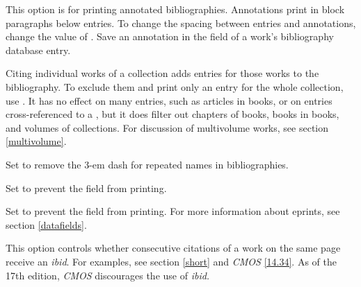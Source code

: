 \documentclass[11pt,letterpaper,oneside]{article}
\begin{document}
\begin{optionlist}


\noindent This option is for printing annotated bibliographies.
Annotations print in block paragraphs below entries. To change
the spacing between entries and annotations, change the value of
. Save an annotation in the 
field of a work's bibliography database entry.


\noindent Citing individual works of a collection adds entries for
those works to the bibliography. To exclude them and print only an
entry for the whole collection, use . It has no effect
on many  entries, such as articles in books, or
on  entries cross-referenced to a
, but it does filter out chapters of books, books
in books, and volumes of collections. For discussion of multivolume
works, see section \ref{multivolume}.


\noindent Set  to remove the 3-em dash for repeated names
in bibliographies.


\noindent Set  to prevent the  field from
printing.


\noindent Set  to prevent the  field from
printing. For more information about eprints, see section
\ref{datafields}.


\noindent This option controls whether consecutive citations of a work
on the same page receive an \textit{ibid}. For examples, see section
\ref{short} and \textit{CMOS} \ref{14.34}. As of the 17th edition,
\textit{CMOS} discourages the use of \textit{ibid.}




\end{optionlist}
\end{document}
